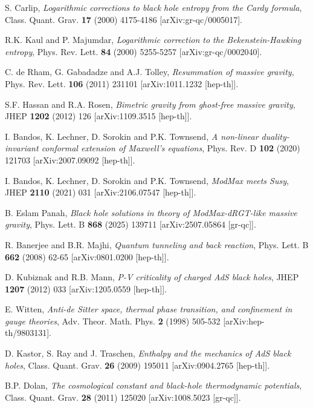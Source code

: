 \documentclass[superscriptaddress, prd, aps,amsmath,amssymb,showpacs,showkeys, onecolumn]{revtex4-2}
\begin{document}
\begin{thebibliography}{99}
S. Carlip, \emph{Logarithmic corrections to black hole entropy from the Cardy formula}, Class. Quant. Grav. \textbf{17} (2000) 4175-4186 [arXiv:gr-qc/0005017].

R.K. Kaul and P. Majumdar, \emph{Logarithmic correction to the Bekenstein-Hawking entropy}, Phys. Rev. Lett. \textbf{84} (2000) 5255-5257 [arXiv:gr-qc/0002040].

C. de Rham, G. Gabadadze and A.J. Tolley, \emph{Resummation of massive gravity}, Phys. Rev. Lett. \textbf{106} (2011) 231101 [arXiv:1011.1232 [hep-th]].

S.F. Hassan and R.A. Rosen, \emph{Bimetric gravity from ghost-free massive gravity}, JHEP \textbf{1202} (2012) 126 [arXiv:1109.3515 [hep-th]].

I. Bandos, K. Lechner, D. Sorokin and P.K. Townsend, \emph{A non-linear duality-invariant conformal extension of Maxwell's equations}, Phys. Rev. D \textbf{102} (2020) 121703 [arXiv:2007.09092 [hep-th]].

I. Bandos, K. Lechner, D. Sorokin and P.K. Townsend, \emph{ModMax meets Susy}, JHEP \textbf{2110} (2021) 031 [arXiv:2106.07547 [hep-th]].

B. Eslam Panah, \emph{Black hole solutions in theory of ModMax-dRGT-like massive gravity}, Phys. Lett. B \textbf{868} (2025) 139711 [arXiv:2507.05864 [gr-qc]].

R. Banerjee and B.R. Majhi, \emph{Quantum tunneling and back reaction}, Phys. Lett. B \textbf{662} (2008) 62-65 [arXiv:0801.0200 [hep-th]].

D. Kubiznak and R.B. Mann, \emph{P-V criticality of charged AdS black holes}, JHEP \textbf{1207} (2012) 033 [arXiv:1205.0559 [hep-th]].

E. Witten, \emph{Anti-de Sitter space, thermal phase transition, and confinement in gauge theories}, Adv. Theor. Math. Phys. \textbf{2} (1998) 505-532 [arXiv:hep-th/9803131].

D. Kastor, S. Ray and J. Traschen, \emph{Enthalpy and the mechanics of AdS black holes}, Class. Quant. Grav. \textbf{26} (2009) 195011 [arXiv:0904.2765 [hep-th]].

B.P. Dolan, \emph{The cosmological constant and black-hole thermodynamic potentials}, Class. Quant. Grav. \textbf{28} (2011) 125020 [arXiv:1008.5023 [gr-qc]].


\end{thebibliography}
\end{document}
